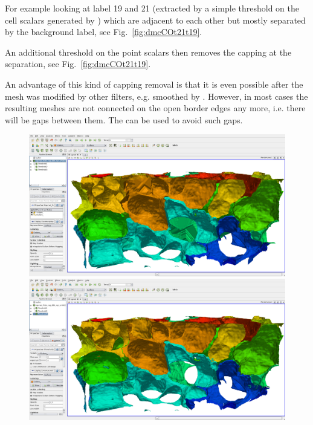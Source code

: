 \documentclass{InsightArticle}
\begin{document}
For example looking at label 19 and 21 (extracted by a simple threshold on the cell scalars generated by ) which are adjacent to each other but mostly separated by the background label, see Fig.~\ref{fig:dmcCOt21t19}.

An additional threshold on the point scalars then removes the capping at the separation, see Fig.~\ref{fig:dmcCOt21t19}.

An advantage of this kind of capping removal is that it is even possible after the mesh was modified by other filters, e.g. smoothed by . However, in most cases the resulting meshes are not connected on the open border edges any more, i.e. there will be gaps between them. The \citep{Grothausmann2014_r} can be used to avoid such gaps.



\begin{figure}
\center
\includegraphics[width=.48\textwidth]{images/vtkDiscreteMarchingCubes_extension_01}
\hfill
\includegraphics[width=.48\textwidth]{images/vtkDiscreteMarchingCubes_extension_02}
\label{fig:dmcCO}
\end{figure}
\end{document}
